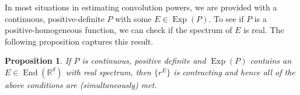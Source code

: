 \documentclass[11pt, letter]{book}
\newtheorem{proposition}[theorem]{Proposition}
\newcommand\End{\operatorname{End}} %
\newcommand\Exp{\operatorname{Exp}}
\begin{document}

\noindent In most situations in estimating convolution powers, we are provided with a continuous, positive-definite $P$ with some $E\in \Exp(P)$. To see if $P$ is a positive-homogeneous function, we can check if the spectrum of $E$ is real. The following proposition captures this result. 

\begin{framed}
\begin{proposition}\label{prop:PosHomSufficientCondition}
If $P$ is continuous, positive definite and $\Exp(P)$ contains an $E\in\End(\mathbb{R}^d)$ with real spectrum, then $\{r^E\}$ is contracting and hence all of the above conditions are (simultaneously) met. 
\end{proposition}
\end{framed}
\end{document}
